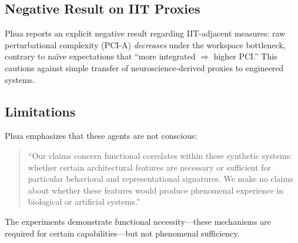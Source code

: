 \subsection{Negative Result on IIT Proxies}

Phua reports an explicit negative result regarding IIT-adjacent measures: raw perturbational complexity (PCI-A) \emph{decreases} under the workspace bottleneck, contrary to na\"ive expectations that ``more integrated $\Rightarrow$ higher PCI.'' This cautions against simple transfer of neuroscience-derived proxies to engineered systems.

\subsection{Limitations}

Phua emphasizes that these agents are not conscious:

\begin{quote}
``Our claims concern functional correlates within these synthetic systems: whether certain architectural features are necessary or sufficient for particular behavioral and representational signatures. We make no claims about whether these features would produce phenomenal experience in biological or artificial systems.''~\citep[p.~2]{phua2025}
\end{quote}

The experiments demonstrate functional necessity---these mechanisms are required for certain capabilities---but not phenomenal sufficiency.
